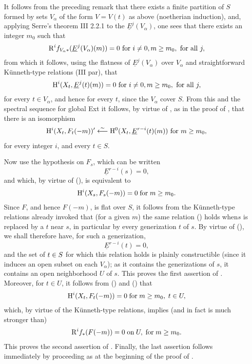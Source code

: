 It follows from the preceding remark that there exists a finite partition of $S$ formed by sets $V_\alpha$ of the form $V=V(t)$ as above (noetherian induction), and, applying Serre's theorem \EGA III 2.2.1 to the $\underline{E}^j(V_\alpha)$, one sees that there exists an integer $m_0$ such that
\[
\R^if_{V_\alpha\ast}(\underline{E}^j(V_\alpha)(m))=0\textup{ for } i\neq 0, m\geq m_0, \textup{ for all }j,
\]
from which it follows, using the flatness of $\underline{E}^j(V_\alpha)$ over $V_\alpha$ and straightforward K\"unneth-type relations (\cf \EGA III par), that
\[
\H^i(X_t, \underline{E}^j(t)(m))=0\textup{ for } i\neq 0, m\geq m_0, \textup{ for all }j,
\]
for every $t\in V_\alpha$, and hence for every $t$, since the $ V_\alpha$ cover $S$. From this and the spectral sequence for global Ext it follows, by virtue of , as in the proof of , that there is an isomorphism
\steco
\begin{equation} \label{eq:XII.8} {}\H^i(X_t, F_t(-m))' \isomfrom \H^0(X_t, \underline{E}^{r-i}(t)(m))\textup{ for } m\geq m_0,
\end{equation}
for every integer $i$, and every $t\in S$.

Now use the hypothesis on $F_s$, which can be written
\steco
\begin{equation} \label{eq:XII.9} {}\underline{E}^{r-i}(s)=0,
\end{equation}
and which, by virtue of (), is equivalent to
\steco
\begin{equation} \label{eq:XII.10} {}\H^i(X_s, F_s(-m))=0 \; \text{for}\; m\geq m_0.
\end{equation}
Since $F$, and hence $F(-m)$, is flat over $S$, it follows from
the K\"unneth-type relations already invoked that (for a given $m$) the
same relation () holds when\pageoriginale $s$ is replaced by a
$t$ near $s$, in particular by every generization $t$ of
$s$. By virtue of (), we shall therefore have, for such a
generization, \steco
\begin{equation} \label{eq:XII.11} {}\underline{E}^{r-i}(t)=0,
\end{equation}
and the set of $t\in \sisi{s}{S}$ for which this relation holds is plainly constructible (since it induces an open subset on each $V_\alpha$); as it contains the generizations of $s$, it contains an open neighborhood $U$ of $s$. This proves the first assertion of . Moreover, for $t\in U$, it follows from () and () that
\steco
\begin{equation} \label{eq:XII.12} {}\H^i(X_t, \sisi{F_t(-m)}{F_t(-m))}=0 \; \text{for}\; m\geq m_0, \; t\in U,
\end{equation}
which, by virtue of the K\"unneth-type relations, implies (and in fact is much stronger than)
\steco
\begin{equation} \label{eq:XII.13} {}\R^if_\ast(F(-m))=0 \; \text{on}\; U, \; \text{for} \; m\geq m_0.
\end{equation}
This proves the second assertion of . Finally, the last assertion follows immediately by proceeding as at the beginning of the proof of .

